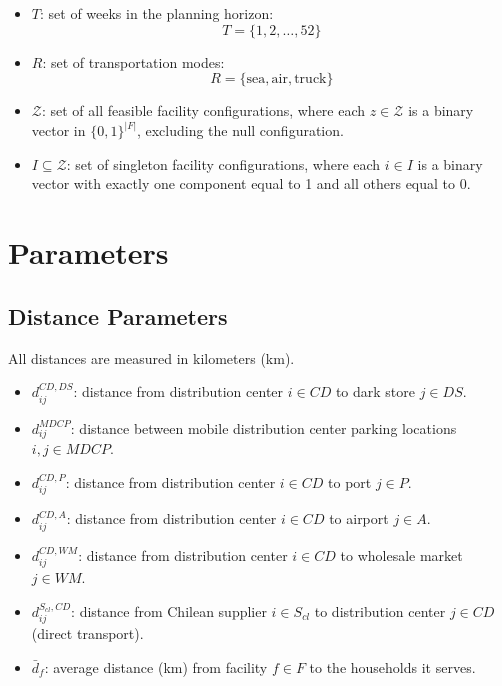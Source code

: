 \documentclass[12pt]{article}
\begin{document}
\begin{itemize}
    \item $T$: set of weeks in the planning horizon:
    \[
    T = \{1, 2, \dots, 52\}
    \]
    
    \item $R$: set of transportation modes:
    \[
    R = \{\text{sea}, \text{air}, \text{truck}\}
    \]

    \item $\mathcal{Z}$: set of all feasible facility configurations, where each $z \in \mathcal{Z}$ is a binary vector in $\{0,1\}^{|F|}$, excluding the null configuration.

    \item $I \subseteq \mathcal{Z}$: set of singleton facility configurations, where each $i \in I$ is a binary vector with exactly one component equal to 1 and all others equal to 0.
    

\end{itemize}
\newpage

\section{Parameters}

\subsection{Distance Parameters}

All distances are measured in kilometers (km).

\begin{itemize}
    \item $d^{CD,DS}_{ij}$: distance from distribution center $i \in CD$ to dark store $j \in DS$.

    \item $d^{MDCP}_{ij}$: distance between mobile distribution center parking locations $i,j \in MDCP$.

    \item $d^{CD,P}_{ij}$: distance from distribution center $i \in CD$ to port $j \in P$.

    \item $d^{CD,A}_{ij}$: distance from distribution center $i \in CD$ to airport $j \in A$.

    \item $d^{CD,WM}_{ij}$: distance from distribution center $i \in CD$ to wholesale market $j \in WM$.
    
    \item $d^{S_{cl},CD}_{ij}$: distance from Chilean supplier $i \in S_{cl}$ to distribution center $j \in CD$ (direct transport).
    
    \item $\bar{d}_f$: average distance (km) from facility $f \in F$ to the households it serves.
    
\end{itemize}
\end{document}
